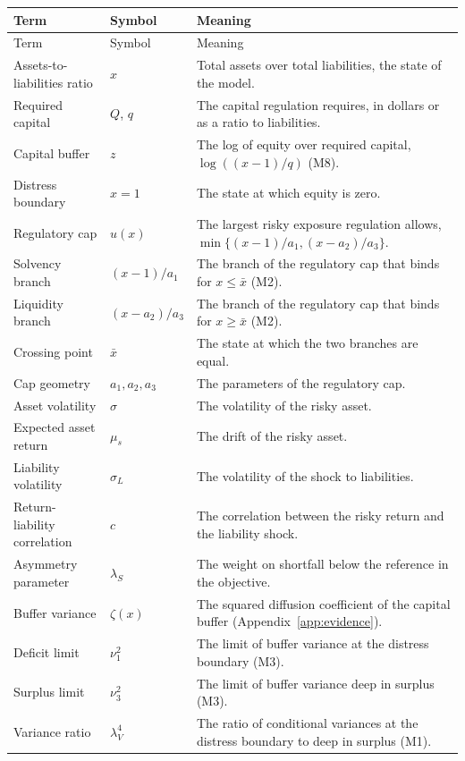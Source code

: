 \footnotesize
\begin{longtable}{@{}P{3.4cm}P{4.2cm}P{8.6cm}@{}}
\toprule
Term & Symbol & Meaning \\
\midrule
\endfirsthead
\toprule
Term & Symbol & Meaning \\
\midrule
\endhead
Assets-to-liabilities ratio & $x$ & Total assets over total liabilities, the state of the model. \\
Required capital & $Q$, $q$ & The capital regulation requires, in dollars or as a ratio to liabilities. \\
Capital buffer & $z$ & The log of equity over required capital, $\log((x-1)/q)$ (M8). \\
Distress boundary & $x=1$ & The state at which equity is zero. \\
Regulatory cap & $u(x)$ & The largest risky exposure regulation allows, $\min\{(x-1)/a_1,(x-a_2)/a_3\}$. \\
Solvency branch & $(x-1)/a_1$ & The branch of the regulatory cap that binds for $x\le\bar x$ (M2). \\
Liquidity branch & $(x-a_2)/a_3$ & The branch of the regulatory cap that binds for $x\ge\bar x$ (M2). \\
Crossing point & $\bar x$ & The state at which the two branches are equal. \\
Cap geometry & $a_1,a_2,a_3$ & The parameters of the regulatory cap. \\
Asset volatility & $\sigma$ & The volatility of the risky asset. \\
Expected asset return & $\mu_s$ & The drift of the risky asset. \\
Liability volatility & $\sigma_L$ & The volatility of the shock to liabilities. \\
Return-liability correlation & $c$ & The correlation between the risky return and the liability shock. \\
Asymmetry parameter & $\lambda_S$ & The weight on shortfall below the reference in the objective. \\
Buffer variance & $\zeta(x)$ & The squared diffusion coefficient of the capital buffer (Appendix~\ref{app:evidence}). \\
Deficit limit & $\nu_1^2$ & The limit of buffer variance at the distress boundary (M3). \\
Surplus limit & $\nu_3^2$ & The limit of buffer variance deep in surplus (M3). \\
Variance ratio & $\lambda_V^4$ & The ratio of conditional variances at the distress boundary to deep in surplus (M1). \\

\end{longtable}
